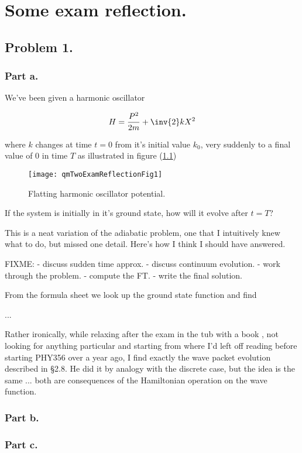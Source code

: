 
%

\chapter{Some exam reflection.}
\label{chap:qmTwoExamReflection}
{}
\date{Dec 13, 2011}

\beginArtWithToc

\section{Problem 1.}
\subsection{Part a.}

We've been given a harmonic oscillator

\begin{equation}\label{eqn:qmTwoExamReflection:n}
H = \frac{P^2}{2m} + \inv{2} k X^2
\end{equation}

where $k$ changes at time $t=0$ from it's initial value $k_0$, very suddenly to a final value of $0$ in time $T$ as illustrated in figure (\ref{fig:qmTwoExamReflection:qmTwoExamReflectionFig1})
\begin{figure}[htp]
   \centering
   \texttt{[image: qmTwoExamReflectionFig1]}
   \caption{Flatting harmonic oscillator potential.}\label{fig:qmTwoExamReflection:qmTwoExamReflectionFig1}
\end{figure}

If the system is initially in it's ground state, how will it evolve after $t = T$?

This is a neat variation of the adiabatic problem, one that I intuitively knew what to do, but missed one detail.  Here's how I think I should have answered.

FIXME: 
- discuss sudden time approx.
- discuss continuum evolution.
- work through the problem.
- compute the FT.
- write the final solution.

From the formula sheet we look up the ground state function and find

...

Rather ironically, while relaxing after the exam in the tub with a book \cite{pauli2000wm}, not looking for anything particular and starting from where I'd left off reading before starting PHY356 over a year ago, I find exactly the wave packet evolution described in \S 2.8.  He did it by analogy with the discrete case, but the idea is the same ... both are consequences of the Hamiltonian operation on the wave function.

\subsection{Part b.}

\subsection{Part c.}


\EndArticle
